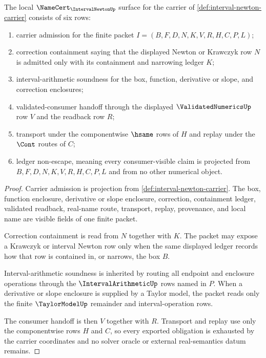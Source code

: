 \begin{theorem}
\label{thm:interval-newton-namecert-obligations}
The local $\NameCert_{\IntervalNewtonUp}$ surface for the carrier of \autoref{def:interval-newton-carrier} consists of six rows:
\begin{enumerate}
\item carrier admission for the finite packet $I=(B,F,D,N,K,V,R,H,C,P,L)$;
\item correction containment saying that the displayed Newton or Krawczyk row $N$ is admitted only with its containment and narrowing ledger $K$;
\item interval-arithmetic soundness for the box, function, derivative or slope, and correction enclosures;
\item validated-consumer handoff through the displayed $\ValidatedNumericsUp$ row $V$ and the readback row $R$;
\item transport under the componentwise $\hsame$ rows of $H$ and replay under the $\Cont$ routes of $C$;
\item ledger non-escape, meaning every consumer-visible claim is projected from $B,F,D,N,K,V,R,H,C,P,L$ and from no other numerical object.
\end{enumerate}
\end{theorem}
\begin{proof}
Carrier admission is projection from \autoref{def:interval-newton-carrier}. The box, function enclosure, derivative or slope enclosure, correction, containment ledger, validated readback, real-name route, transport, replay, provenance, and local name are visible fields of one finite packet.

Correction containment is read from $N$ together with $K$. The packet may expose a Krawczyk or interval Newton row only when the same displayed ledger records how that row is contained in, or narrows, the box $B$.

Interval-arithmetic soundness is inherited by routing all endpoint and enclosure operations through the $\IntervalArithmeticUp$ rows named in $P$. When a derivative or slope enclosure is supplied by a Taylor model, the packet reads only the finite $\TaylorModelUp$ remainder and interval-operation rows.

The consumer handoff is then $V$ together with $R$. Transport and replay use only the componentwise rows $H$ and $C$, so every exported obligation is exhausted by the carrier coordinates and no solver oracle or external real-semantics datum remains.
\end{proof}

